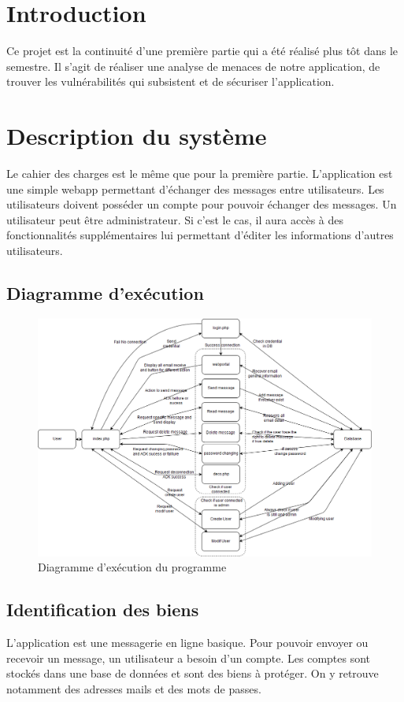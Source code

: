 \documentclass[12pt]{article}
\begin{document}


\tableofcontents

\listoffigures

\newpage
\section{Introduction}
Ce projet est la continuité d'une première partie qui a été réalisé plus tôt dans le semestre. Il s'agit de réaliser une analyse de menaces de notre application, de trouver les vulnérabilités qui subsistent et de sécuriser l'application.

\section{Description du système}
Le cahier des charges est le même que pour la première partie. L'application est une simple webapp permettant d'échanger des messages entre utilisateurs. Les utilisateurs doivent posséder un compte pour pouvoir échanger des messages. Un utilisateur peut être administrateur. Si c'est le cas, il aura accès à des fonctionnalités supplémentaires lui permettant d'éditer les informations d'autres utilisateurs.

\subsection{Diagramme d'exécution}
\begin{figure}[H]
\centering
\includegraphics[width=\linewidth]{images/DFD.png}
\caption{Diagramme d'exécution du programme}
\end{figure}
\subsection{Identification des biens}
L'application est une messagerie en ligne basique. Pour pouvoir envoyer ou recevoir un message, un utilisateur a besoin d'un compte. Les comptes sont stockés dans une base de données et sont des biens à protéger. On y retrouve notamment des adresses mails et des mots de passes. 
\end{document}
